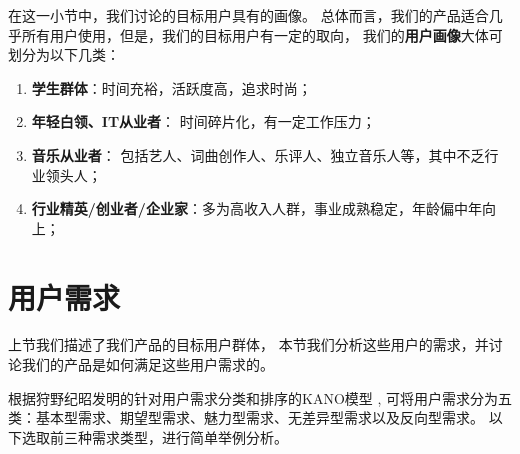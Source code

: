 在这一小节中，我们讨论\proname 的目标用户具有的画像。
总体而言，我们的产品适合几乎所有用户使用，但是，我们的目标用户有一定的取向，
我们的\textbf{用户画像}大体可划分为以下几类：
\begin{enumerate}
    \item \textbf{学生群体}：时间充裕，活跃度高，追求时尚；
    \item \textbf{年轻白领、IT从业者}：
    时间碎片化，有一定工作压力；
    \item \textbf{音乐从业者}：
    包括艺人、词曲创作人、乐评人、独立音乐人等，其中不乏行业领头人；
    \item \textbf{行业精英/创业者/企业家}：多为高收入人群，事业成熟稳定，年龄偏中年向上；
    \iffalse
    \R{
    \item \textbf{K歌爱好者}：
    这类用户对于产品的K歌功能较为感兴趣，有强烈的分享欲望；
    \item \textbf{音乐社交者}：
    这类用户喜爱通过分享音乐、交流歌单、纂写乐评等方式通过音乐来进行社交活动。
    }
    \fi
\end{enumerate}

\section{用户需求} %

上节我们描述了我们产品的目标用户群体， 
    本节我们分析这些用户的需求，并讨论我们的产品是如何满足这些用户需求的。

根据狩野纪昭发明的针对用户需求分类和排序的KANO模型
, 
    可将用户需求分为五类：基本型需求、期望型需求、魅力型需求、无差异型需求以及反向型需求。
    以下选取前三种需求类型，进行简单举例分析。

